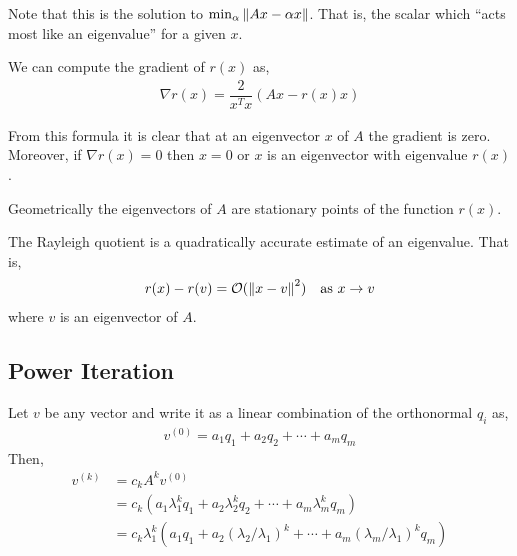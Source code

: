 \documentclass[12pt]{article}
\begin{document}
Note that this is the solution to \( \min_\alpha \left\lVert Ax - \alpha x\right\rVert \). That is, the scalar which ``acts most like an eigenvalue'' for a given \( x \).

We can compute the gradient of \( r(x) \) as,
\begin{align*}
    \nabla r(x) = \dfrac{2}{x^Tx}(Ax-r(x)x)
\end{align*}

From this formula it is clear that at an eigenvector \( x \) of \( A \) the gradient is zero. Moreover, if \( \nabla r(x) = 0 \) then \( x = 0 \) or \( x  \) is an eigenvector with eigenvalue \( r(x) \).

Geometrically the eigenvectors of \( A \) are stationary points of the function \( r(x) \).

The Rayleigh quotient is a quadratically accurate estimate of an eigenvalue. That is,
\begin{align*}
    r(x) - r(v) = \mathcal{O}(\left\lVert x-v\right\rVert^2) && \text{as } x\to v
\end{align*}
where \( v \) is an eigenvector of \( A \).

\subsection{Power Iteration}

\begin{algorithm}
\begin{algorithmic}
\EndFor
\end{algorithmic}
\end{algorithm}

Let \( v \) be any vector and write it as a linear combination of the orthonormal \( q_i \) as,
\begin{align*}
    v^{(0)} = a_1q_1 + a_2q_2 + \cdots + a_mq_m
\end{align*}
Then,
\begin{align*}
    v^{(k)} &= c_k A^k v^{(0)} \\
    &= c_k(a_1 \lambda_1^k q_1 + a_2 \lambda_2^k q_2 + \cdots + a_m\lambda_m^k q_m) \\
    &=  c_k\lambda_1^k \left( a_1q_1 + a_2(\lambda_2/\lambda_1)^k + \cdots + a_m(\lambda_m/\lambda_1)^k q_m \right)
\end{align*}
\end{document}
